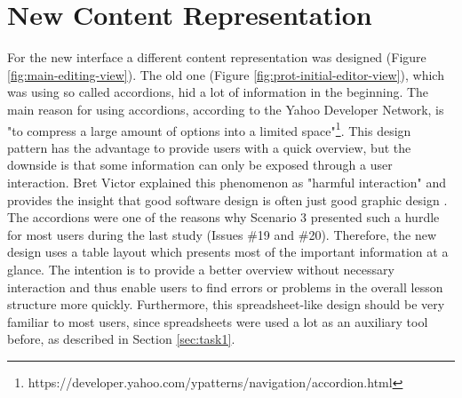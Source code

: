 \section{New Content Representation}
For the new interface a different content representation was designed (Figure \ref{fig:main-editing-view}). The old one (Figure \ref{fig:prot-initial-editor-view}), which was using so called accordions, hid a lot of information in the beginning. The main reason for using accordions, according to the Yahoo Developer Network, is "to compress a large amount of options into a limited space"\footnote{https://developer.yahoo.com/ypatterns/navigation/accordion.html}. This design pattern has the advantage to provide users with a quick overview, but the downside is that some information can only be exposed through a user interaction. Bret Victor explained this phenomenon as "harmful interaction" and provides the insight that good software design is often just good graphic design \cite{victor_magic_2006}. The accordions were one of the reasons why Scenario 3 presented such a hurdle for most users during the last study (Issues \#19 and \#20). Therefore, the new design uses a table layout which presents most of the important information at a glance. The intention is to provide a better overview without necessary interaction and thus enable users to find errors or problems in the overall lesson structure more quickly. Furthermore, this spreadsheet-like design should be very familiar to most users, since spreadsheets were used a lot as an auxiliary tool before, as described in Section \ref{sec:task1}.



